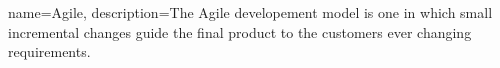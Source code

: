 {
  name={Agile},
  description={The Agile developement model is one in which small incremental changes guide the final product to the customers ever changing requirements.}
}


